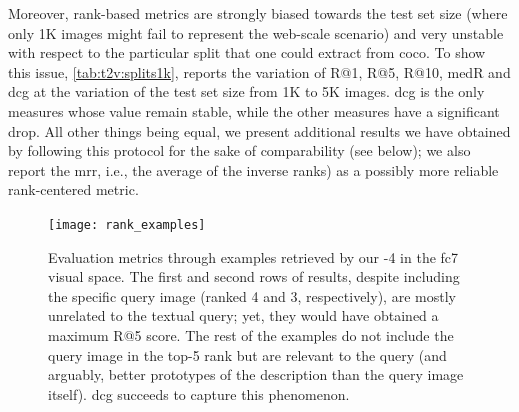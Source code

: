 Moreover, rank-based metrics are strongly biased towards the test set size (where only 1K images might fail to represent the web-scale scenario) and very unstable with respect to the particular split that one could extract from \gls{coco}.
To show this issue, \ref{tab:t2v:splits1k}, reports the variation of R@1, R@5, R@10, \gls{medR} and \gls{dcg} at the variation of the test set size from 1K to 5K images.
\gls{dcg} is the only measures whose value remain stable, while the other measures have a significant drop.
All other things being equal, we present additional results we have obtained by following this protocol for the sake of comparability (see below);
we also report the \acrfull{mrr}, i.e.,  the average of the inverse ranks) as a possibly more reliable rank-centered metric.

\begin{figure}
 \texttt{[image: rank\_examples]}
 \caption{Evaluation metrics through examples retrieved by our \widedeepttv{}-4 in the fc7 visual space.
The first and second rows of results, despite including the specific query image (ranked 4 and 3, respectively), are mostly unrelated to the textual query;
 yet, they would have obtained a maximum R@5 score.
 The rest of the examples do not include the query image in the top-5 rank but are relevant to the query (and arguably, better prototypes of the description than the query image itself).
 \gls{dcg} succeeds to capture this phenomenon.}
 \label{fig:t2v:metrics}
\end{figure}

